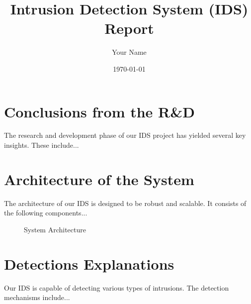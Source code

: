 \documentclass{article}
\title{Intrusion Detection System (IDS) Report}
\author{Your Name}
\date{\today}
\begin{document}
\maketitle

\section{Conclusions from the R\&D}
The research and development phase of our IDS project has yielded several key insights. These include...

\section{Architecture of the System}
The architecture of our IDS is designed to be robust and scalable. It consists of the following components...

\begin{figure}[h!]
    \centering
    \caption{System Architecture}
    \label{fig:architecture}
\end{figure}

\section{Detections Explanations}
Our IDS is capable of detecting various types of intrusions. The detection mechanisms include...
\end{document}
